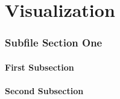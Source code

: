 \documentclass[./FDA_document_template.tex]{subfiles}
\begin{document}
\renewcommand{\onlyinsubfile}[1]{#1}
\renewcommand{\notinsubfile}[1]{}
 
\setcounter{part}{5}
\pagestyle{Standard}

\part{Visualization}
 
 
 
 \section{Subfile Section One}

\lipsum[1]

\subsection{First Subsection}

\lipsum[2]

\subsection{Second Subsection}

\lipsum[3]

\bigskip
 
\end{document}
